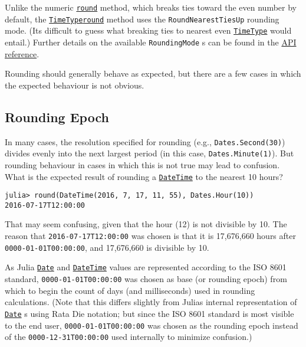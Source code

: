 Unlike the numeric \hyperlink{2394121098218027856}{\texttt{round}} method, which breaks ties toward the even number by default, the \hyperlink{4438614350756187528}{\texttt{TimeType}}\hyperlink{2394121098218027856}{\texttt{round}} method uses the \texttt{RoundNearestTiesUp} rounding mode. (It{\textquotesingle}s difficult to guess what breaking ties to nearest {\textquotedbl}even{\textquotedbl} \hyperlink{4438614350756187528}{\texttt{TimeType}} would entail.) Further details on the available \texttt{RoundingMode} s can be found in the \hyperlink{2504340439131318713}{API reference}.



Rounding should generally behave as expected, but there are a few cases in which the expected behaviour is not obvious.



\hypertarget{18235125897086797691}{}


\subsection{Rounding Epoch}



In many cases, the resolution specified for rounding (e.g., \texttt{Dates.Second(30)}) divides evenly into the next largest period (in this case, \texttt{Dates.Minute(1)}). But rounding behaviour in cases in which this is not true may lead to confusion. What is the expected result of rounding a \hyperlink{17572689933274889838}{\texttt{DateTime}} to the nearest 10 hours?




\begin{verbatim}
julia> round(DateTime(2016, 7, 17, 11, 55), Dates.Hour(10))
2016-07-17T12:00:00
\end{verbatim}



That may seem confusing, given that the hour (12) is not divisible by 10. The reason that \texttt{2016-07-17T12:00:00} was chosen is that it is 17,676,660 hours after \texttt{0000-01-01T00:00:00}, and 17,676,660 is divisible by 10.



As Julia \hyperlink{4488183467971164548}{\texttt{Date}} and \hyperlink{17572689933274889838}{\texttt{DateTime}} values are represented according to the ISO 8601 standard, \texttt{0000-01-01T00:00:00} was chosen as base (or {\textquotedbl}rounding epoch{\textquotedbl}) from which to begin the count of days (and milliseconds) used in rounding calculations. (Note that this differs slightly from Julia{\textquotesingle}s internal representation of \hyperlink{4488183467971164548}{\texttt{Date}} s using Rata Die notation; but since the ISO 8601 standard is most visible to the end user, \texttt{0000-01-01T00:00:00} was chosen as the rounding epoch instead of the \texttt{0000-12-31T00:00:00} used internally to minimize confusion.)



